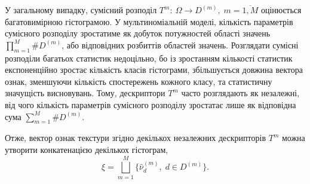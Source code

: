 У загальному випадку, сумісний розподіл $T^m\colon\ \Omega \to D^{(m)}, \; m=\overline{1,M}$ оцінюється багатовимірною гістограмою. 
У мультиноміальній моделі, кількість параметрів сумісного розподілу зростатиме як добуток потужностей області значень $\prod_{m=1}^M \# D^{(m)}$, або відповідних розбиттів областей значень.
Розглядати сумісні розподіли багатьох статистик недоцільно, бо із зростанням кількості статистик експоненційно зростає кількість класів гістограми, 
збільшується довжина вектора ознак, зменшуючи кількість спостережень кожного класу, та статистичну значущість висновувань.
Тому, дескриптори $T^m$ часто розглядають як незалежні, від чого кількість параметрів сумісного розподілу зростатає лише як відповідна сума $\sum_{m=1}^M \# D^{(m)}$.

Отже, вектор ознак текстури згідно декількох незалежних дескрипторів $T^m$ можна утворити конкатенацією декількох гістограм,
\begin{equation*}
    \xi = \bigsqcup_{m=1}^M \{\hat \nu^{(m)}_d, \; d\in D^{(m)}\}.
\end{equation*}




